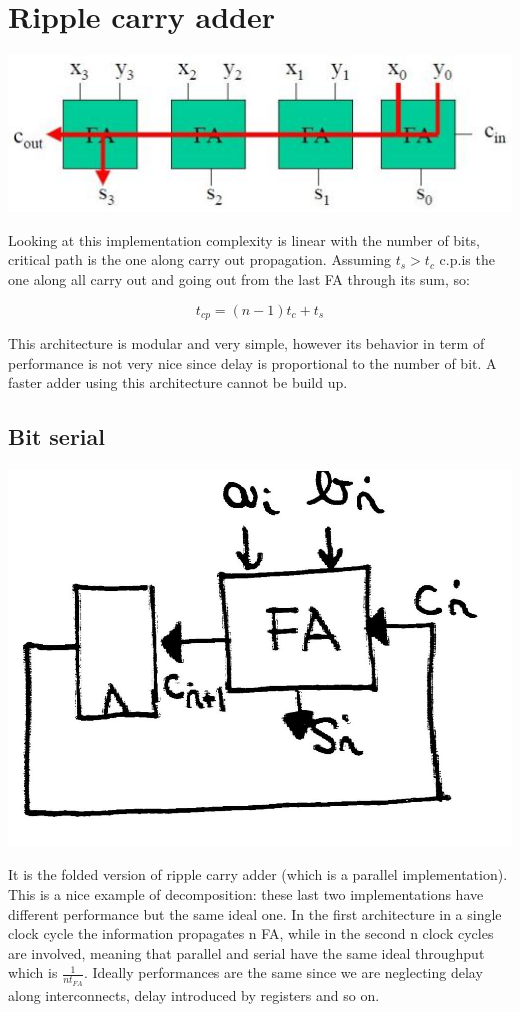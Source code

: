 \section{Ripple carry adder}
\begin{center}
  \includegraphics[width=0.7\linewidth]{img/img2/2}
\end{center}

Looking at this implementation complexity is linear with the number of bits,
critical path is the one along carry out propagation. Assuming $t_s>t_c$ c.p.is
the one along all carry out and going out from the last FA through its sum, so:

$$t_{cp}=(n-1)t_c+t_s$$

This architecture is modular and very simple, however its behavior in term of
performance is not very nice since delay is proportional to the number of bit.
A faster adder using this architecture cannot be build up.


\subsection{Bit serial}

\begin{center}
  \includegraphics[width=0.5\linewidth]{img/img2/3}
\end{center}

It is the folded version of ripple carry adder (which is a parallel 
implementation). This is a nice example of decomposition: these last two 
implementations have different performance but the same ideal one. In the first
architecture in a single clock cycle the information propagates n FA, while in
the second n clock cycles are involved, meaning that parallel and serial have 
the same ideal throughput which is $\frac{1}{nt_{FA}}$.
Ideally performances are the same since we are neglecting delay along
interconnects, delay introduced by registers and so on.

